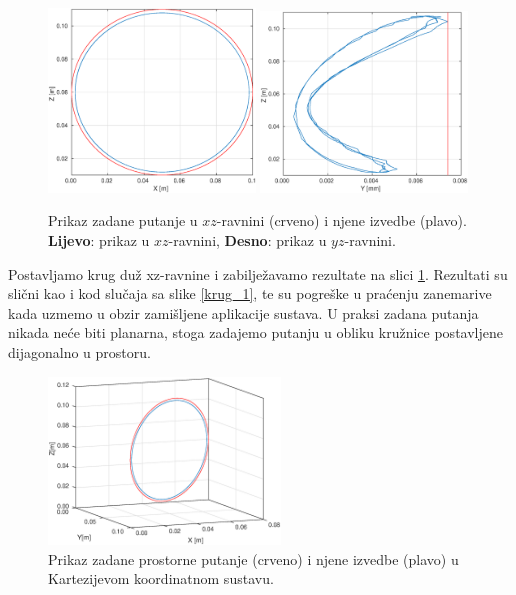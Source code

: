 \documentclass[times, utf8, diplomski, numeric]{fer}
\begin{document}
\begin{figure}[h!]
\centering
\includegraphics[width=0.49\textwidth]{xz_krug2}
\includegraphics[width=0.49\textwidth]{yz_krug2}
\caption{Prikaz zadane putanje u $xz$-ravnini (crveno) i njene izvedbe (plavo). \textbf{Lijevo}: prikaz u $xz$-ravnini, \textbf{Desno}: prikaz u $yz$-ravnini.} \label{krug_2}
\end{figure}
Postavljamo krug duž xz-ravnine i zabilježavamo rezultate na slici \ref{krug_2}.
Rezultati su slični kao i kod slučaja sa slike \ref{krug_1}, te su pogreške u praćenju zanemarive kada uzmemo u obzir zamišljene aplikacije sustava.
U praksi zadana putanja nikada neće biti planarna, stoga zadajemo putanju u obliku kružnice postavljene dijagonalno u prostoru.
\begin{figure}[h!]
\centering
\includegraphics[width=0.55\textwidth]{xyz_krug3}
\caption{Prikaz zadane prostorne putanje  (crveno) i njene izvedbe (plavo) u Kartezijevom koordinatnom sustavu.} \label{krug_3}
\end{figure}
\end{document}
